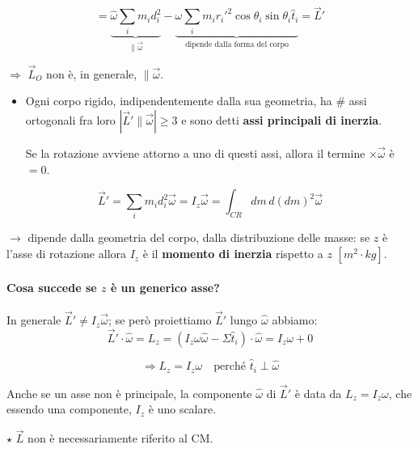 \begin{equation}
\boxed{= \underbrace{\hat{\omega} \sum_i m_i d_i^2}_{\parallel \vec{\omega}} - \underbrace{\omega \sum_i m_i r_i'^2 \cos\theta_i \sin\theta_i \hat{t}_i}_{\text{dipende dalla forma del corpo}} = \vec{L}'}
\end{equation}

$\Rightarrow$ $\vec{L}_O$ non è, in generale, $\parallel \vec{\omega}$.

\begin{itemize}
    \item Ogni corpo rigido, indipendentemente dalla sua geometria, ha $\#$ assi ortogonali fra loro $|\vec{L}' \parallel \vec{\omega}| \geq 3$ e sono detti \textbf{assi principali di inerzia}.
    
    Se la rotazione avviene attorno a uno di questi assi, allora il termine $\times \vec{\omega}$ è $= 0$.
\end{itemize}

\begin{equation}
\vec{L}' = \sum_i m_i d_i^2 \vec{\omega} = \boxed{I_z \vec{\omega}} = \int_{CR} dm\, d(dm)^2 \vec{\omega}
\end{equation}

$\rightarrow$ dipende dalla geometria del corpo, dalla distribuzione delle masse: se $z$ è l'asse di rotazione allora $I_z$ è il \textbf{momento di inerzia} rispetto a $z$ $[m^2 \cdot kg]$.

\paragraph{Cosa succede se $z$ è un generico asse?}
In generale $\vec{L}' \neq I_z \vec{\omega}$; se però proiettiamo $\vec{L}'$ lungo $\hat{\omega}$ abbiamo:
\begin{equation}
\vec{L}' \cdot \hat{\omega} = L_z = (I_z \omega \hat{\omega} - \Sigma \hat{t}_i) \cdot \hat{\omega} = I_z \omega + 0
\end{equation}

\begin{equation}
\Rightarrow \boxed{L_z = I_z \omega} \quad \text{perché } \hat{t}_i \perp \hat{\omega}
\end{equation}

\begin{osservazione}{}
Anche se un asse non è principale, la componente $\hat{\omega}$ di $\vec{L}'$ è data da $L_z = I_z\omega$, che essendo una componente, $I_z$ è uno scalare.

$\star$ $\vec{L}$ non è necessariamente riferito al CM.
\end{osservazione}

